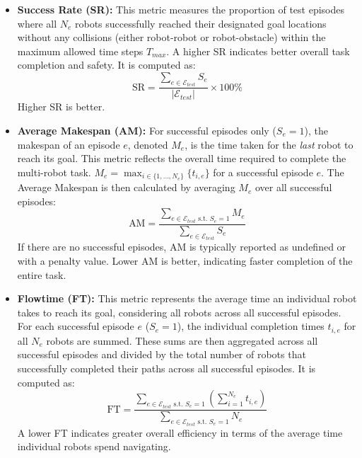 \begin{itemize}
    \item \textbf{Success Rate (SR):} This metric measures the proportion of test episodes where all $N_e$ robots successfully reached their designated goal locations without any collisions (either robot-robot or robot-obstacle) within the maximum allowed time steps $T_{max}$. A higher SR indicates better overall task completion and safety.
    It is computed as:
    \begin{equation}
        \text{SR} = \frac{\sum_{e \in \mathcal{E}_{test}} S_e}{|\mathcal{E}_{test}|} \times 100\%
        \label{eq:sr}
    \end{equation}
    Higher SR is better.

    \item \textbf{Average Makespan (AM):} For successful episodes only ($S_e=1$), the makespan of an episode $e$, denoted $M_e$, is the time taken for the \textit{last} robot to reach its goal. This metric reflects the overall time required to complete the multi-robot task.
    $M_e = \max_{i \in \{1, ..., N_e\}} \{t_{i,e}\}$ for a successful episode $e$.
    The Average Makespan is then calculated by averaging $M_e$ over all successful episodes:
    \begin{equation}
        \text{AM} = \frac{\sum_{e \in \mathcal{E}_{test} \text{ s.t. } S_e=1} M_e}{\sum_{e \in \mathcal{E}_{test}} S_e}
        \label{eq:am}
    \end{equation}
    If there are no successful episodes, AM is typically reported as undefined or with a penalty value. Lower AM is better, indicating faster completion of the entire task.

    \item \textbf{Flowtime (FT):} This metric represents the average time an individual robot takes to reach its goal, considering all robots across all successful episodes. For each successful episode $e$ ($S_e=1$), the individual completion times $t_{i,e}$ for all $N_e$ robots are summed. These sums are then aggregated across all successful episodes and divided by the total number of robots that successfully completed their paths across all successful episodes.
    It is computed as:
    \begin{equation}
        \text{FT} = \frac{\sum_{e \in \mathcal{E}_{test} \text{ s.t. } S_e=1} \left( \sum_{i=1}^{N_e} t_{i,e} \right)}{\sum_{e \in \mathcal{E}_{test} \text{ s.t. } S_e=1} N_e}
        \label{eq:ft_defined}
    \end{equation}
    A lower FT indicates greater overall efficiency in terms of the average time individual robots spend navigating.


\end{itemize}
